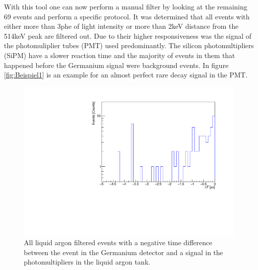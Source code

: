With this tool one can now perform a manual filter by looking at the remaining 69 events and perform a specific protocol.
It was determined that all events with either more than 3phe of light intensity or more than 2keV distance from the 514keV peak are filtered out.
Due to their higher responsiveness was the signal of the photomuliplier tubes (PMT) used predominantly.
The silicon photomultipliers (SiPM) have a slower reaction time and the majority of events in them that happened before the Germanium signal were background events.
In figure \ref{fig:Beispiel1} is an example for an almost perfect rare  decay signal in the PMT.
\\

\begin{figure}[ht!]
	\centering
	\ifmakefigures%
	\includegraphics[width=130mm]{./Bilder/TriggerTimeOnly4.pdf}
	\fi%
	\caption{\label{fig:Trigger4}
		All liquid argon filtered events with a negative time difference between the event in the Germanium detector and a signal in the photomultipliers in the liquid argon tank.
	}
\end{figure}














